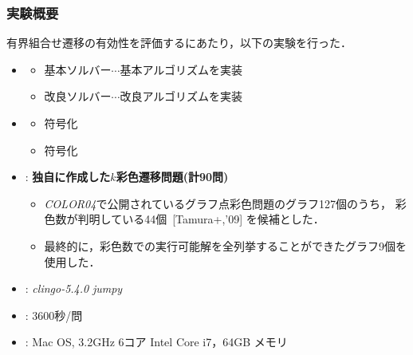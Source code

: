 \documentclass[dvipdfmx,11pt]{beamer}
\begin{document}
\begin{frame}\frametitle{実験概要}
  \begin{block}{}\centering
    有界組合せ遷移の有効性を評価するにあたり，以下の実験を行った．
  \end{block}
  \bigskip
  \begin{itemize}
  \item {}
    \begin{itemize}
    \item 基本ソルバー$\cdots$基本アルゴリズムを実装
    \item 改良ソルバー$\cdots$改良アルゴリズムを実装
    \end{itemize}
  \item {}
    \begin{itemize}
    \item {}符号化
    \item {}符号化
    \end{itemize}
  \item {}: \alert{\bf 独自に作成した$k$彩色遷移問題(計90問)}
    \begin{itemize}
    \item \textit{COLOR04}で公開されているグラフ点彩色問題のグラフ127個のうち，
      彩色数が判明している44個~[Tamura+,'09] を候補とした．
    \item 最終的に，彩色数での実行可能解を全列挙することができたグラフ9個を使用した．
    \end{itemize}
    \item {}: \textit{clingo-5.4.0} \textit{jumpy}
    \item {}: 3600秒/問
    \item {}: Mac OS, 3.2GHz 6コア Intel Core i7，64GB メモリ
    \end{itemize}
\end{frame}
\end{document}
